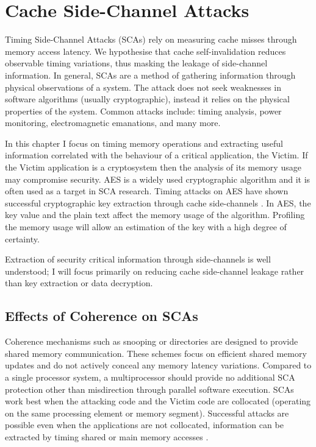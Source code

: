 \makeatletter
\makeatother
\ifpdf
\graphicspath{{Chapter2/Chapter2Figs/PNG/}{Chapter2/Chapter2Figs/PDF/}{Chapter2/Chapter2Figs/}}
\else
\graphicspath{{Chapter2/Chapter2Figs/EPS/}{Chapter2/Chapter2Figs/}}
\fi

\chapter{Cache Side-Channel Attacks}
	\label{chapter_sca}

	Timing Side-Channel Attacks (SCAs) rely on measuring cache misses through memory access latency. We hypothesise that cache self-invalidation reduces observable timing variations, thus masking the leakage of side-channel information. In general, SCAs are a method of gathering information through physical observations of a system. The attack does not seek weaknesses in software algorithms (usually cryptographic), instead it relies on the physical properties of the system. Common attacks include: timing analysis, power monitoring, electromagnetic emanations, and many more. 
	
	In this chapter I focus on timing memory operations and extracting useful information correlated with the behaviour of a critical application, the Victim. If the Victim application is a cryptosystem then the analysis of its memory usage may compromise security. AES is a widely used cryptographic algorithm and it is often used as a target in SCA research. Timing attacks on AES have shown successful cryptographic key extraction through cache side-channels \cite{Brumley03,Percival05,Bonneau06_0}. 
	In AES, the key value and the plain text affect the memory usage of the algorithm. Profiling the memory usage will allow an estimation of the key with a high degree of certainty. 
	
	Extraction of security critical information through side-channels is well understood; I will focus primarily on reducing cache side-channel leakage rather than key extraction or data decryption.

\section{Effects of Coherence on SCAs}
	Coherence mechanisms such as snooping or directories are designed to provide shared memory communication. These schemes focus on efficient shared memory updates and do not actively conceal any memory latency variations. Compared to a single processor system, a multiprocessor should provide no additional SCA protection other than misdirection through parallel software execution. SCAs work best when the attacking code and the Victim code are collocated (operating on the same processing element or memory segment). Successful attacks are possible even when the applications are not collocated, information can be extracted by timing shared or main memory accesses \cite{Ristenpart09,Brumley11,Hund13,Yarom14}.
	
